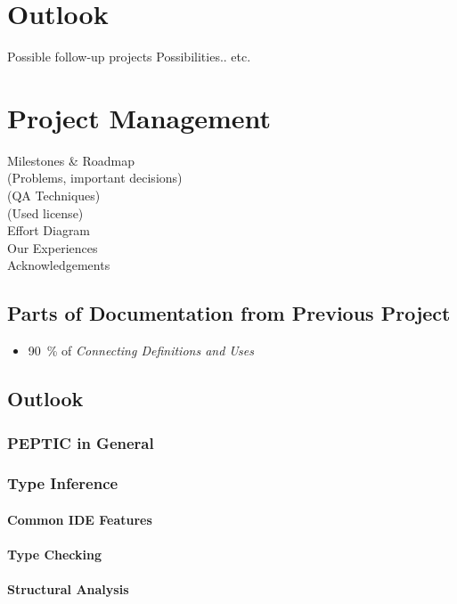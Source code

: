 \documentclass[12pt,halfparskip,DIV11,BCOR10mm]{scrreprt}
\begin{document}
\chapter{Outlook}
 Possible follow-up projects
 Possibilities.. etc.

\chapter{Project Management}
 Milestones \& Roadmap \\
 (Problems, important decisions) \\
 (QA Techniques) \\
 (Used license) \\
 Effort Diagram \\
 Our Experiences \\
 Acknowledgements 



\section{Parts of Documentation from Previous Project}

\begin{itemize}
	\item 90~\% of \emph{Connecting Definitions and Uses} %
\end{itemize}

\section{Outlook}
\subsection{PEPTIC in General}
\subsection{Type Inference}
\subsubsection{Common IDE Features}
\subsubsection{Type Checking}
\subsubsection{Structural Analysis}
\end{document}
